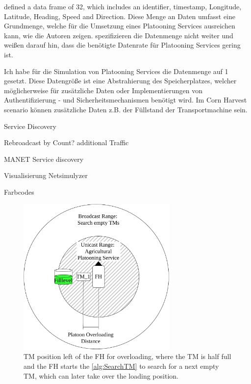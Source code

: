 \textcite{zhang_method_2009} defined a data frame of \SI{32}{\byte}, which includes an identifier, timestamp, Longitude, Latitude, Heading, Speed and Direction.
Diese Menge an Daten umfasst eine Grundmenge, welche für die Umsetzung eines Platooning Services ausreichen kann, wie die Autoren zeigen.
\textcite{schlingmann_aef_2019} spezifizieren die Datenmenge nicht weiter und weißen darauf hin, dass die benötigte Datenrate für Platooning Services gering ist.

Ich habe für die Simulation von Platooning Services die Datenmenge auf \SI{1}{\kilo\byte} gesetzt. Diese Datengröße ist eine Abstrahierung des Speicherplatzes, welcher möglicherweise für zusätzliche Daten oder Implementierungen von Authentifizierung -  und Sicherheitsmechanismen benötigt wird. Im Corn Harvest scenario können zusätzliche Daten z.B. der Füllstand der Transportmachine sein. 


Service Discovery

Rebroadcast by Count?
additional Traffic

MANET Service discovery

Visualisierung Netsimulyzer

Farbcodes

\begin{figure}[H]%
	\centering
	\includegraphics[width=0.7\textwidth]{figures/platoonHALF}
	\caption{\acf{TM} position left of the \acf{FH} for overloading, where the \ac{TM} is half full and the
		\ac{FH} starts the \autoref{alg:SearchTM} to search for a next empty \ac{TM},
		which can later take over the loading position.}
	\label{fig:PlatooningHF}%
\end{figure}

